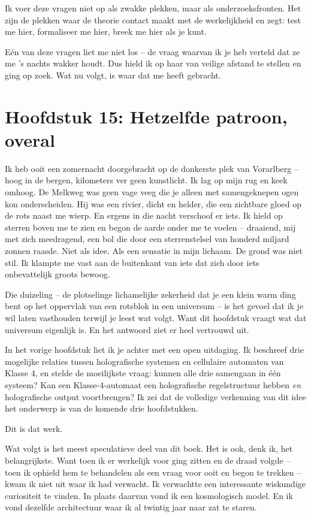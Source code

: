 \documentclass[11pt, twoside, openright]{book}
\begin{document}
Ik voer deze vragen niet op als zwakke plekken, maar als onderzoeksfronten. Het zijn de plekken waar de theorie contact maakt met de werkelijkheid en zegt: test me hier, formaliseer me hier, breek me hier als je kunt.

Eén van deze vragen liet me niet los -- de vraag waarvan ik je heb verteld dat ze me 's nachts wakker houdt. Dus hield ik op haar van veilige afstand te stellen en ging op zoek. Wat nu volgt, is waar dat me heeft gebracht.


\chapter*{Hoofdstuk 15: Hetzelfde patroon, overal}

Ik heb ooit een zomernacht doorgebracht op de donkerste plek van Vorarlberg -- hoog in de bergen, kilometers ver geen kunstlicht. Ik lag op mijn rug en keek omhoog. De Melkweg was geen vage veeg die je alleen met samengeknepen ogen kon onderscheiden. Hij was een rivier, dicht en helder, die een zichtbare gloed op de rots naast me wierp. En ergens in die nacht verschoof er iets. Ik hield op sterren boven me te zien en begon de aarde onder me te voelen -- draaiend, mij met zich meedragend, een bol die door een sterrenstelsel van honderd miljard zonnen raasde. Niet als idee. Als een sensatie in mijn lichaam. De grond was niet stil. Ik klampte me vast aan de buitenkant van iets dat zich door iets onbevattelijk groots bewoog.

Die duizeling -- de plotselinge lichamelijke zekerheid dat je een klein warm ding bent op het oppervlak van een rotsblok in een universum -- is het gevoel dat ik je wil laten vasthouden terwijl je leest wat volgt. Want dit hoofdstuk vraagt wat dat universum eigenlijk is. En het antwoord ziet er heel vertrouwd uit.


In het vorige hoofdstuk liet ik je achter met een open uitdaging. Ik beschreef drie mogelijke relaties tussen holografische systemen en cellulaire automaten van Klasse 4, en stelde de moeilijkste vraag: kunnen alle drie samengaan in één systeem? Kan een Klasse-4-automaat een holografische regelstructuur hebben \textit{en} holografische output voortbrengen? Ik zei dat de volledige verkenning van dit idee het onderwerp is van de komende drie hoofdstukken.

Dit is dat werk.

Wat volgt is het meest speculatieve deel van dit boek. Het is ook, denk ik, het belangrijkste. Want toen ik er werkelijk voor ging zitten en de draad volgde -- toen ik ophield hem te behandelen als een vraag voor ooit en begon te trekken -- kwam ik niet uit waar ik had verwacht. Ik verwachtte een interessante wiskundige curiositeit te vinden. In plaats daarvan vond ik een kosmologisch model. En ik vond dezelfde architectuur waar ik al twintig jaar naar zat te staren.
\end{document}
